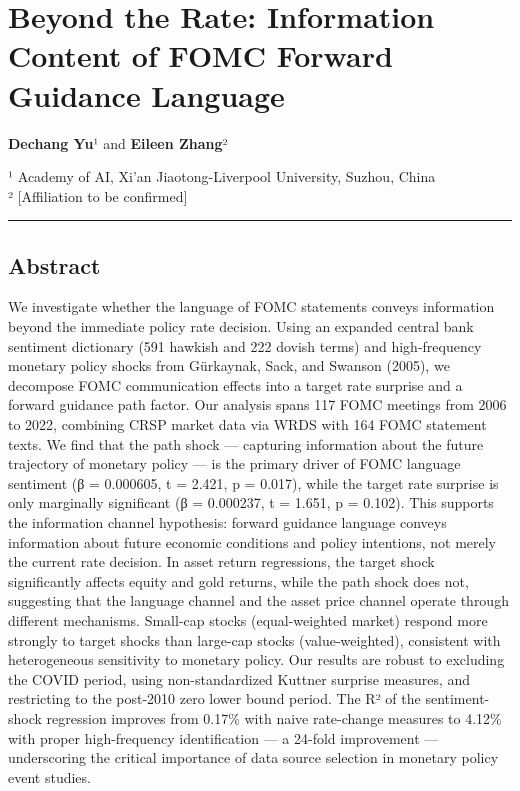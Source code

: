 \documentclass[
]{article}
\author{}
\date{}
\begin{document}
\section{Beyond the Rate: Information Content of FOMC Forward Guidance
Language}\label{beyond-the-rate-information-content-of-fomc-forward-guidance-language}

\textbf{Dechang Yu}¹ and \textbf{Eileen Zhang}²

¹ Academy of AI, Xi'an Jiaotong-Liverpool University, Suzhou, China\\
² {[}Affiliation to be confirmed{]}

\begin{center}\rule{0.5\linewidth}{0.5pt}\end{center}

\subsection{Abstract}\label{abstract}

We investigate whether the language of FOMC statements conveys
information beyond the immediate policy rate decision. Using an expanded
central bank sentiment dictionary (591 hawkish and 222 dovish terms) and
high-frequency monetary policy shocks from Gürkaynak, Sack, and Swanson
(2005), we decompose FOMC communication effects into a target rate
surprise and a forward guidance path factor. Our analysis spans 117 FOMC
meetings from 2006 to 2022, combining CRSP market data via WRDS with 164
FOMC statement texts. We find that the path shock --- capturing
information about the future trajectory of monetary policy --- is the
primary driver of FOMC language sentiment (β = 0.000605, t = 2.421, p =
0.017), while the target rate surprise is only marginally significant (β
= 0.000237, t = 1.651, p = 0.102). This supports the information channel
hypothesis: forward guidance language conveys information about future
economic conditions and policy intentions, not merely the current rate
decision. In asset return regressions, the target shock significantly
affects equity and gold returns, while the path shock does not,
suggesting that the language channel and the asset price channel operate
through different mechanisms. Small-cap stocks (equal-weighted market)
respond more strongly to target shocks than large-cap stocks
(value-weighted), consistent with heterogeneous sensitivity to monetary
policy. Our results are robust to excluding the COVID period, using
non-standardized Kuttner surprise measures, and restricting to the
post-2010 zero lower bound period. The R² of the sentiment-shock
regression improves from 0.17\% with naive rate-change measures to
4.12\% with proper high-frequency identification --- a 24-fold
improvement --- underscoring the critical importance of data source
selection in monetary policy event studies.
\end{document}
